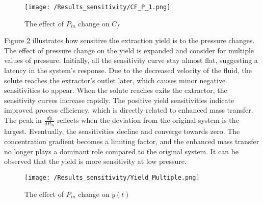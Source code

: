 \documentclass[../Article_Sensitivity_Analsysis.tex]{subfiles}
\begin{document}
	\begin{figure}[!ht]
		\centering
		\texttt{[image: /Results\_sensitivity/CF\_P\_1.png]}
		\caption{The effect of $P_{in}$ change on $C_f$}
		\label{fig:Sensitivty_P_CF}
	\end{figure}
	
	Figure \ref{fig:Sensitivty_P_y} illustrates how sensitive the extraction yield is to the pressure changes. The effect of pressure change on the yield is expanded and consider for multiple values of pressure. Initially, all the sensitivity curve stay almost flat, suggesting a latency in the system's response. Due to the decreased velocity of the fluid, the solute reaches the extractor's outlet later, which causes minor negative sensitivities to appear. When the solute reaches exits the extractor, the sensitivity curves increase rapidly. The positive yield sensitivities indicate improved process efficiency, which is directly related to enhanced mass transfer. The peak in $\frac{dy}{dP_{in}}$ reflects when the deviation from the original system is the largest. Eventually, the sensitivities decline and converge towards zero. The concentration gradient becomes a limiting factor, and the enhanced mass transfer no longer plays a dominant role compared to the original system. It can be observed that the yield is more sensitivity at low pressure. 
	
	\begin{figure}[!ht]
		\centering
		\texttt{[image: /Results\_sensitivity/Yield\_Multiple.png]}
		\caption{The effect of $P_{in}$ change on $y(t)$}
		\label{fig:Sensitivty_P_y}
	\end{figure}
		
\end{document}
